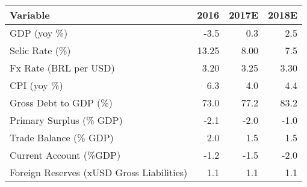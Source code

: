 \documentclass[11pt]{article}
\author{user}
\date{\today}
\title{}
\begin{document}
\begin{center}
\begin{tabular}{lrrr}
\hline
\textbf{Variable} & \textbf{2016} & \textbf{2017E} & \textbf{2018E}\\
\hline
\hline
GDP (yoy \%) & -3.5 & 0.3 & 2.5\\
Selic Rate (\%) & 13.25 & 8.00 & 7.5\\
Fx Rate (BRL per USD) & 3.20 & 3.25 & 3.30\\
CPI (yoy \%) & 6.3 & 4.0 & 4.4\\
Gross Debt to GDP (\%) & 73.0 & 77.2 & 83.2\\
Primary Surplus (\% GDP) & -2.1 & -2.0 & -1.0\\
Trade Balance (\% GDP) & 2.0 & 1.5 & 1.5\\
Current Account (\%GDP) & -1.2 & -1.5 & -2.0\\
Foreign Reserves (xUSD Gross Liabilities) & 1.1 & 1.1 & 1.1\\
\hline
\end{tabular}
\end{center}
\end{document}
